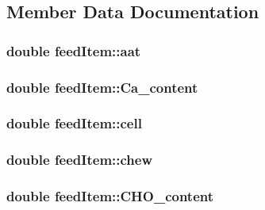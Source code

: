 \subsection{Member Data Documentation}
\hypertarget{classfeed_item_a68a4482387c13fa8cddaae7b6f57eb41}{
\subsubsection[{aat}]{\setlength{\rightskip}{0pt plus 5cm}double {\bf feedItem::aat}}}
\label{classfeed_item_a68a4482387c13fa8cddaae7b6f57eb41}
\hypertarget{classfeed_item_ac788c820b5c7d3312930d93c26dad5b0}{
\subsubsection[{Ca\_\-content}]{\setlength{\rightskip}{0pt plus 5cm}double {\bf feedItem::Ca\_\-content}}}
\label{classfeed_item_ac788c820b5c7d3312930d93c26dad5b0}
\hypertarget{classfeed_item_a533e749e1e0a2dea338621c1a3b926dd}{
\subsubsection[{cell}]{\setlength{\rightskip}{0pt plus 5cm}double {\bf feedItem::cell}}}
\label{classfeed_item_a533e749e1e0a2dea338621c1a3b926dd}
\hypertarget{classfeed_item_a7f5463568597590e951205e68bec8d86}{
\subsubsection[{chew}]{\setlength{\rightskip}{0pt plus 5cm}double {\bf feedItem::chew}}}
\label{classfeed_item_a7f5463568597590e951205e68bec8d86}
\hypertarget{classfeed_item_ad57f1616cff410de8e833da22378d416}{
\subsubsection[{CHO\_\-content}]{\setlength{\rightskip}{0pt plus 5cm}double {\bf feedItem::CHO\_\-content}}}
